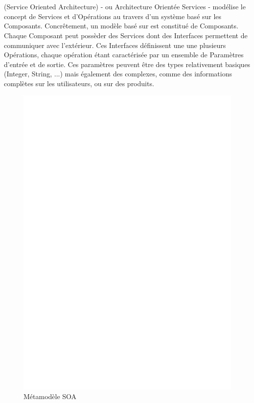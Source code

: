 \section{\kwsoa}\label{sub:soa}

\kwsoa (Service Oriented Architecture) - ou Architecture Orientée Services - modélise le concept de Services et d'Opérations au travers d'un système basé sur les Composants. Concrêtement, un modèle basé sur \kwsoa est constitué de Composants. Chaque Composant peut possèder des Services dont des Interfaces permettent de communiquer avec l'extérieur. Ces Interfaces définissent une une plusieurs Opérations, chaque opération étant caractérisée par un ensemble de Paramètres d'entrée et de sortie. Ces paramètres peuvent être des types relativement basiques (Integer, String, ...) mais également des  complexes, comme des informations complètes sur les utilisateurs, ou sur des produits.	

\begin{figure}[htb]
  \centering
  \includegraphics[scale=.3]{img/SOA.eps}
  \caption{Métamodèle SOA}
  \label{fig:soa}
\end{figure}


